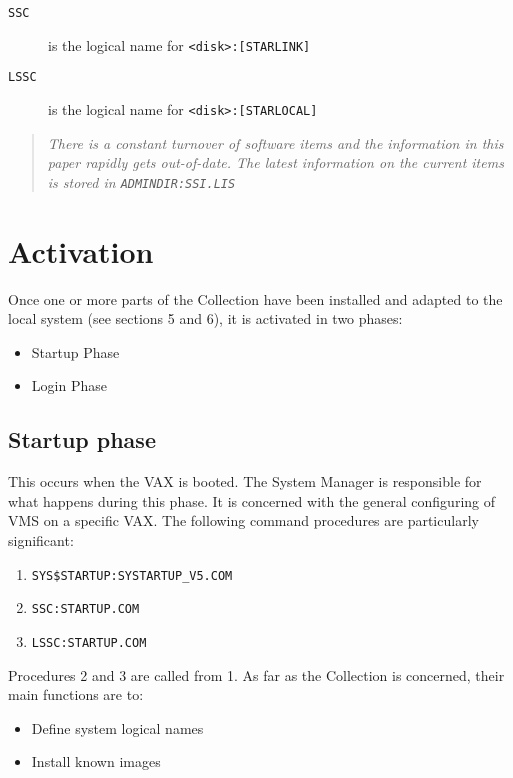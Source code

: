 \begin{description}
\item [{\tt SSC}] is the logical name for \verb+<disk>:[STARLINK]+
\item [{\tt LSSC}] is the logical name for \verb+<disk>:[STARLOCAL]+
\end{description}

\begin{quote}\em
There is a constant turnover of software items and the information in this
paper rapidly gets out-of-date. The latest information on the current items is
stored in {\tt ADMINDIR:SSI.LIS}
\end{quote}

\section {Activation}
\label{se:active}

Once one or more parts of the Collection have been installed and adapted to the
local system (see sections 5 and 6), it is activated in two phases:

\begin{itemize}
\item Startup Phase
\item Login Phase
\end{itemize}

\subsection {Startup phase}
\label{ss:startup}

This occurs when the VAX is booted. The System Manager is responsible for what
happens during this phase. It is concerned with the general configuring of VMS
on a specific VAX. The following command procedures are particularly
significant:

\begin{enumerate}
\item {\tt SYS\$STARTUP:SYSTARTUP\_V5.COM}
\item {\tt SSC:STARTUP.COM}
\item {\tt LSSC:STARTUP.COM}
\end{enumerate}

Procedures 2 and 3 are called from 1. As far as the Collection is concerned,
their main functions are to:

\begin{itemize}
\item Define system logical names
\item Install known images
\end{itemize}


